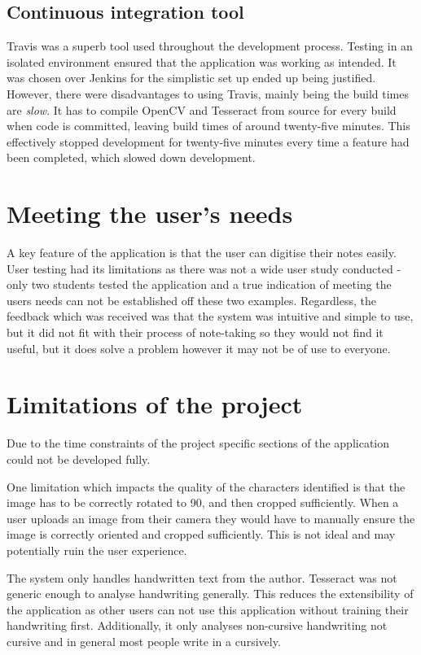 \subsection{Continuous integration tool}
Travis was a superb tool used throughout the development process. Testing in an isolated environment ensured that the application was working as intended. It was chosen over Jenkins for the simplistic set up ended up being justified. However, there were disadvantages to using Travis, mainly being the build times are \textit{slow}. It has to compile OpenCV and Tesseract from source for every build when code is committed, leaving build times of around twenty-five minutes. This effectively stopped development for twenty-five minutes every time a feature had been completed, which slowed down development.

\section{Meeting the user's needs}
A key feature of the application is that the user can digitise their notes easily. User testing had its limitations as there was not a wide user study conducted - only two students tested the application and a  true indication of meeting the users needs can not be established off these two examples.  Regardless, the feedback which was received was that the system was intuitive and simple to use, but it did not fit with their process of note-taking so they would not find it useful, but it does solve a problem however it may not be of use to everyone.


\section{Limitations of the project}
Due to the time constraints of the project specific sections of the application could not be developed fully.

One limitation which impacts the quality of the characters identified is that the image has to be correctly rotated to 90\textdegree, and then cropped sufficiently. When a user uploads an image from their camera they would have to manually ensure the image is correctly oriented and cropped sufficiently. This is not ideal and may potentially ruin the user experience.

The system only handles handwritten text from the author. Tesseract was not generic enough to analyse handwriting generally. This reduces the extensibility of the application as other users can not use this application without training their handwriting first. Additionally, it only analyses non-cursive handwriting not cursive and in general most people write in a cursively.

